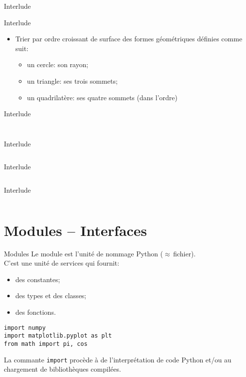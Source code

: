 \documentclass[dvipsnames]{beamer}
\def\interlude{
\begin{frame}[standout]
Interlude\\[1em]
    \centerline{\decothreeleft\;\rotatebox[origin=c]{180}{\decothreeleft}}
\end{frame}
}
\begin{document}
\interlude

\begin{frame}
    [fragile]{Interlude}
    \begin{itemize}
        \item Trier par ordre croissant de surface des formes géométriques
              définies comme suit:
              \begin{itemize}
                  \item un cercle: son rayon;
                  \item un triangle: ses trois sommets;
                  \item un quadrilatère: ses quatre sommets (dans l'ordre)
              \end{itemize}
    \end{itemize}

\end{frame}

\begin{frame} [fragile]{Interlude}
    \inputminted[lastline=9, fontsize=\scriptsize]{python3}{code/interlude_03_2.py}
    \inputminted[firstline=15, lastline=20, fontsize=\scriptsize]{python3}{code/interlude_03_2.py}
\end{frame}
\begin{frame} [fragile]{Interlude}
    \inputminted[firstline=23, lastline=37, fontsize=\scriptsize]{python3}{code/interlude_03_2.py}
\end{frame}
\begin{frame} [fragile]{Interlude}
    \inputminted[firstline=40, lastline=55, fontsize=\scriptsize]{python3}{code/interlude_03_2.py}
\end{frame}
\begin{frame} [fragile]{Interlude}
    \inputminted[firstline=58, lastline=72, fontsize=\scriptsize]{python3}{code/interlude_03_2.py}
\end{frame}


\section{Modules -- Interfaces}

\begin{frame}
    [fragile]{Modules}
    Le module est l'unité de nommage Python ($\approx$\,fichier).\\
    C'est une \alert{unité de services} qui fournit:
    \begin{itemize}
        \item des constantes;
        \item des types et des classes;
        \item des fonctions.
    \end{itemize}

    \begin{verbatim}
import numpy
import matplotlib.pyplot as plt
from math import pi, cos
\end{verbatim}

    La commante \texttt{import} procède à de l'interprétation de code Python
    et/ou au chargement de bibliothèques compilées.
\end{frame}
\end{document}
